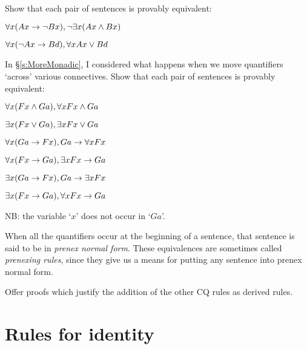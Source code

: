 \problempart
Show that each pair of sentences is provably equivalent:
\begin{earg}
\item $\forall x (Ax\rightarrow \neg Bx), \neg\exists x(Ax \wedge Bx)$
\item $\forall x (\neg Ax\rightarrow Bd), \forall x Ax \vee Bd$
\end{earg}

\problempart
In §\ref{s:MoreMonadic}, I considered what happens when we move quantifiers `across' various connectives. Show that each pair of sentences is provably equivalent:
\begin{earg}
\item $\forall x (Fx \wedge Ga), \forall x Fx \wedge Ga$
\item $\exists x (Fx \vee Ga), \exists x Fx \vee Ga$
\item $\forall x(Ga \rightarrow Fx), Ga \rightarrow \forall x Fx$
\item $\forall x(Fx \rightarrow Ga), \exists x Fx \rightarrow Ga$
\item $\exists x(Ga \rightarrow Fx), Ga \rightarrow \exists x Fx$
\item $\exists x(Fx \rightarrow Ga), \forall x Fx \rightarrow Ga$
\end{earg}
NB: the variable `$x$' does not occur in `$Ga$'.

When all the quantifiers occur at the beginning of a sentence, that sentence is said to be in \emph{prenex normal form}. These equivalences are sometimes called \emph{prenexing rules}, since they give us a means for putting any sentence into prenex normal form.



\problempart
Offer proofs which justify the addition of the other CQ rules as derived rules.



\chapter{Rules for identity}\label{ch.identity}


